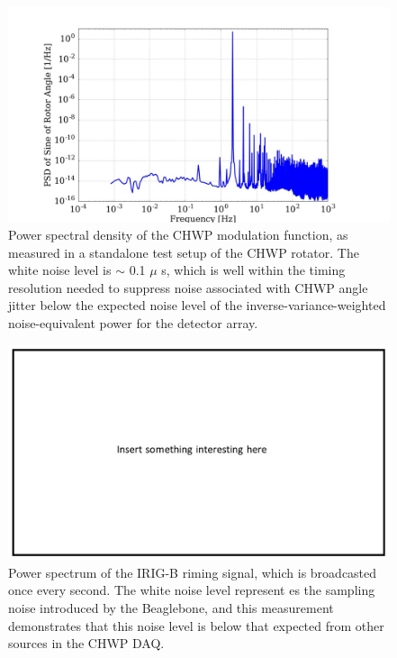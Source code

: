 \begin{figure}
    \centering
    \includegraphics[width=0.98\linewidth]{CHWPEvaluation/Figures/chwp_sine_angle.jpg}
    \caption[CHWP modulation function power spectral density]{Power spectral density of the CHWP modulation function, as measured in a standalone test setup of the CHWP rotator. The white noise level is $\sim$ 0.1 $\mu$ s, which is well within the timing resolution needed to suppress noise associated with CHWP angle jitter below the expected noise level of the inverse-variance-weighted noise-equivalent power for the detector array.}
    \label{fig:chwp_mod_func_psd}
\end{figure}

\begin{figure}
    \centering
    \includegraphics[width=0.98\linewidth]{Other/empty.jpg}
    \caption[Beaglebone IRIG power spectral density]{Power spectrum of the IRIG-B riming signal, which is broadcasted once every second. The white noise level represent es the sampling noise introduced by the Beaglebone, and this measurement demonstrates that this noise level is below that expected from other sources in the CHWP DAQ.}
    \label{fig:chwp_bbb_irig_psd}
\end{figure}


